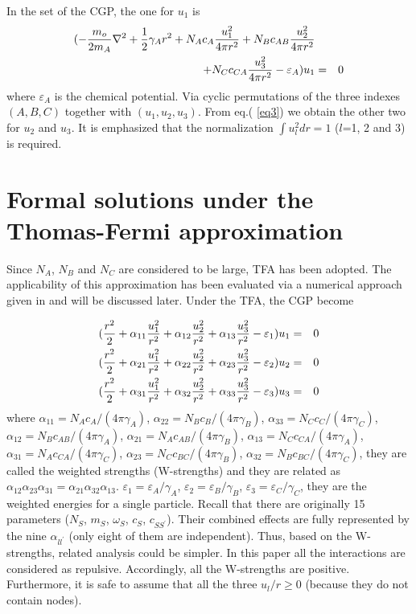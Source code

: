 \documentclass[single-column,showpacs,groupedaddress]{revtex4}
\begin{document}
In the set of the CGP, the one for $u_{1}$ is
\begin{eqnarray}
(-\frac{m_{o}}{2m_{A}}\nabla ^{2}+\frac{1}{2}\gamma _{A}r^{2}+N_{A}c_{A}%
\frac{u_{1}^{2}}{4\pi r^{2}}+N_{B}c_{AB}\frac{u_{2}^{2}}{4\pi r^{2}}\notag \\
+N_{C}c_{CA}\frac{u_{3}^{2}}{4\pi r^{2}}-\varepsilon _{A})u_{1} &=&0 \label{eq3}
\end{eqnarray}%
where $\varepsilon _{A}$ is the chemical potential. Via cyclic permutations
of the three indexes $(A,B,C)$ together with $(u_{1},u_{2},u_{3})$. From eq.(%
\ref{eq3}) we obtain the other two for $u_{2}$ and $u_{3}$. It is emphasized
that the normalization ${\int u_{l}^{2}dr=1}$ ($l$=1, 2 and 3) is required.

\section*{Formal solutions under the Thomas-Fermi approximation}

Since $N_{A}$, $N_{B}$ and $N_{C}$ are considered to be large, TFA has been
adopted. The applicability of this approximation has been evaluated via a
numerical approach given in \cite{yzhe,polo15} and will be discussed later.
Under the TFA, the CGP become

\begin{eqnarray}
(\frac{r^{2}}{2}+\alpha _{11}\frac{u_{1}^{2}}{r^{2}}+\alpha _{12}\frac{%
u_{2}^{2}}{r^{2}}+\alpha _{13}\frac{u_{3}^{2}}{r^{2}}-\varepsilon _{1})u_{1}
&=&0  \notag \\
(\frac{r^{2}}{2}+\alpha _{21}\frac{u_{1}^{2}}{r^{2}}+\alpha _{22}\frac{%
u_{2}^{2}}{r^{2}}+\alpha _{23}\frac{u_{3}^{2}}{r^{2}}-\varepsilon _{2})u_{2}
&=&0  \notag \\
(\frac{r^{2}}{2}+\alpha _{31}\frac{u_{1}^{2}}{r^{2}}+\alpha _{32}\frac{%
u_{2}^{2}}{r^{2}}+\alpha _{33}\frac{u_{3}^{2}}{r^{2}}-\varepsilon _{3})u_{3}
&=&0  \label{eq4}
\end{eqnarray}%
where $\alpha _{11}=N_{A}c_{A}/(4\pi \gamma _{A})$, $\alpha
_{22}=N_{B}c_{B}/(4\pi \gamma _{B})$, $\alpha _{33}=N_{C}c_{C}/(4\pi \gamma
_{C})$, $\alpha _{12}=N_{B}c_{AB}/(4\pi \gamma _{A})$, $\alpha
_{21}=N_{A}c_{AB}/(4\pi \gamma _{B})$, $\alpha _{13}=N_{C}c_{CA}/(4\pi
\gamma _{A})$, $\alpha _{31}=N_{A}c_{CA}/(4\pi \gamma _{C})$, $\alpha
_{23}=N_{C}c_{BC}/(4\pi \gamma _{B})$, $\alpha _{32}=N_{B}c_{BC}/(4\pi
\gamma _{C})$, they are called the weighted strengths (W-strengths) and they
are related as $\alpha _{12}\alpha _{23}\alpha _{31}=\alpha _{21}\alpha
_{32}\alpha _{13}$. $\varepsilon _{1}=\varepsilon _{A}/\gamma _{A}$, $%
\varepsilon _{2}=\varepsilon _{B}/\gamma _{B}$, $\varepsilon
_{3}=\varepsilon _{C}/\gamma _{C}$, they are the weighted energies for a
single particle. Recall that there are originally 15 parameters ($N_{S}$, $%
m_{S}$, $\omega _{S}$, $c_{S}$, $c_{SS^{\prime }}$). Their combined effects
are fully represented by the nine $\alpha _{ll^{\prime }}$ (only eight of
them are independent). Thus, based on the W-strengths, related analysis
could be simpler. In this paper all the interactions are considered as
repulsive. Accordingly, all the W-strengths are positive. Furthermore, it is
safe to assume that all the three $u_{l}/r\geq 0$ (because they do not
contain nodes).
\end{document}

